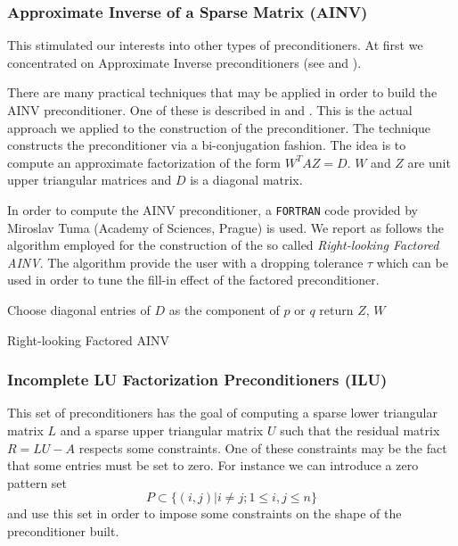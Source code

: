 \documentclass[a4paper,10pt]{article}
\begin{document}
\subsubsection*{Approximate Inverse of a Sparse Matrix (AINV)}

This stimulated our interests into other types of preconditioners. At first we
concentrated on Approximate Inverse preconditioners (see \cite{Saad} and
\cite{Benzi2002}).

There are many practical techniques that may be applied in order to build the
AINV preconditioner.
One of these is described in \cite{Tuma1996} and \cite{Tuma1998}.
This is the actual approach we applied to the construction of the
preconditioner. The technique constructs the preconditioner via a
bi-conjugation fashion.
The idea is to compute an approximate factorization of the form $W^T A Z=D$.
$W$ and $Z$ are unit upper triangular matrices and $D$ is a diagonal matrix.

In order to compute the AINV preconditioner, a \texttt{FORTRAN} code
provided by Miroslav Tuma (Academy of Sciences, Prague) is used.
We report as follows the algorithm employed for the construction of the so
called \textit{Right-looking Factored AINV}. The algorithm provide the user
with a dropping tolerance $\tau$ which can be used in order to tune the fill-in
effect
of the factored preconditioner. \newline

\begin{algorithm}[H]
 \;
 Choose diagonal entries of $D$ as the component of $p$ or $q$\;
 return $Z$, $W$\;
 \caption{Right-looking Factored AINV}
\end{algorithm}

\subsubsection*{Incomplete LU Factorization Preconditioners (ILU)}
This set of preconditioners has the goal of computing a sparse lower triangular
matrix $L$ and a sparse upper triangular matrix $U$ such that the residual
matrix $R=LU-A$ respects some constraints. One of these constraints may be the
fact that some entries must be set to zero.
For instance we can introduce a zero pattern set
\[
 P\subset \{(i,j)\lvert i\ne j; 1\le i,j\le n\}
\]
and use this set in order to impose some constraints on the shape of the
preconditioner built.\newline
\end{document}
